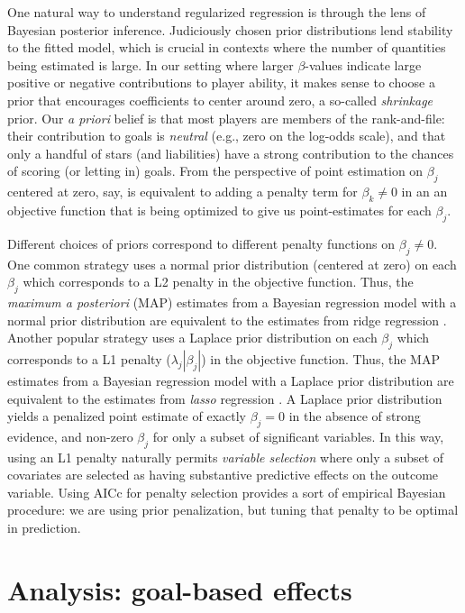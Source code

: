 One natural way to understand regularized regression is through the lens of
Bayesian posterior inference. Judiciously chosen prior distributions lend
stability to the fitted model, which is crucial in contexts where the number
of quantities being estimated is large. In our setting where larger
$\beta$-values indicate large positive or negative contributions to player
ability, it makes sense to choose a prior that encourages coefficients to
center around zero, a so-called {\em shrinkage} prior.  Our {\em a priori}
belief is that most players are members of the rank-and-file: their
contribution to goals is {\em neutral} (e.g., zero on the log-odds scale), and
that only a handful of stars (and liabilities) have a strong contribution to
the chances of scoring (or letting in) goals.  From the perspective of point
estimation on $\beta_j$ centered at zero, say, is equivalent to adding a
penalty term for $\beta_k \ne 0$ in an an objective function that is being
optimized to give us point-estimates for each $\beta_j$.

Different choices of priors correspond to different penalty functions on
$\beta_j \ne 0$. One common strategy uses a normal prior distribution
(centered at zero) on each $\beta_j$ which corresponds to a L2 penalty in the
objective function.  Thus, the {\em maximum a posteriori} (MAP) estimates from
a Bayesian regression model with a normal prior distribution are equivalent to
the estimates from ridge regression \cite{HoeKen70}. Another popular strategy
uses a Laplace prior distribution on each $\beta_j$ which corresponds to a L1
penalty ($\lambda_j |\beta_j|$) in the objective function.  Thus, the MAP
estimates from a Bayesian regression model with a Laplace prior distribution
are equivalent to the estimates from {\it lasso} regression \cite{Tib96}.  A
Laplace prior distribution yields a penalized point estimate of exactly
$\beta_j=0$ in the absence of strong evidence, and non-zero $\beta_j$ for only
a subset of significant variables.  In this way, using an L1 penalty naturally
permits {\it variable selection} where only a subset of covariates are
selected as having substantive predictive effects on the outcome variable.
Using AICc for penalty selection provides a sort of empirical Bayesian procedure: we are using prior penalization, but tuning that penalty to be optimal in prediction.


\section{Analysis: goal-based effects}
\label{sec:goals}


